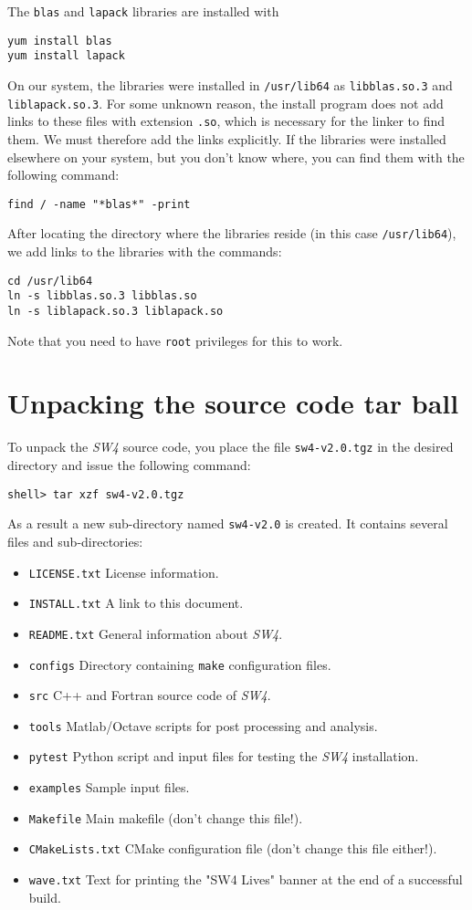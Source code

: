 \documentclass[11pt]{article}
\begin{document}
The \verb+blas+ and \verb+lapack+ libraries are installed with
\begin{verbatim}
yum install blas
yum install lapack
\end{verbatim}
On our system, the libraries were installed in \verb+/usr/lib64+ as \verb+libblas.so.3+ and
\verb+liblapack.so.3+. For some unknown reason, the install program does not add links to these
files with extension \verb+.so+, which is necessary for the linker to find them. We must therefore
add the links explicitly. If the libraries were installed elsewhere on your system, but you don't
know where, you can find them with the following command:
\begin{verbatim}
find / -name "*blas*" -print
\end{verbatim}
After locating the directory where the libraries reside (in this case \verb+/usr/lib64+), we add
links to the libraries with the commands:
\begin{verbatim}
cd /usr/lib64
ln -s libblas.so.3 libblas.so
ln -s liblapack.so.3 liblapack.so
\end{verbatim}
Note that you need to have \verb+root+ privileges for this to work.

\section{Unpacking the source code tar ball}

To unpack the \emph{SW4} source code, you place the file \verb+sw4-v2.0.tgz+ in the
desired directory and issue the following command:
\begin{verbatim}
shell> tar xzf sw4-v2.0.tgz
\end{verbatim}
As a result a new sub-directory named \verb+sw4-v2.0+ is created. It contains several files
and sub-directories:
%
\begin{itemize}
\item \verb+LICENSE.txt+ License information.
\item \verb+INSTALL.txt+ A link to this document.
\item \verb+README.txt+ General information about \emph{SW4}.
\item \verb+configs+ Directory containing \verb+make+ configuration files.
\item \verb+src+ C++ and Fortran source code of \emph{SW4}.
\item \verb+tools+ Matlab/Octave scripts for post processing and analysis.
\item \verb+pytest+ Python script and input files for testing the \emph{SW4} installation.
\item \verb+examples+ Sample input files.
\item \verb+Makefile+ Main makefile (don't change this file!).
\item \verb+CMakeLists.txt+ CMake configuration file (don't change this file either!).
\item \verb+wave.txt+ Text for printing the "SW4 Lives" banner at the end of a successful build.
\end{itemize}
\end{document}
